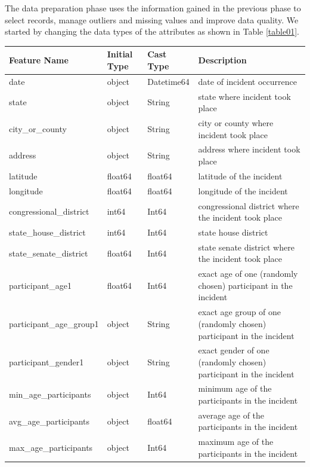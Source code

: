 \documentclass[10pt,a4paper]{report}
\begin{document}
The data preparation phase uses the information gained in the previous phase to select records, manage outliers and missing values and improve data quality.
We started by changing the data types of the attributes as shown in Table \ref{table01}.

\begin{table}
	\centering
	\begin{small}
	\begin{tabular}{|l|l|l|p{7cm}|}
		\hline
		\textbf{Feature Name} & \textbf{Initial Type} & \textbf{Cast Type} & \textbf{Description}\\
		\hline
		date & object & Datetime64 & date of incident occurrence\\
		\hline
		state & object & String & state where incident took place\\
		\hline
		city\_or\_county & object & String & city or county where incident took place\\
		\hline
		address & object & String & address where incident took place\\
		\hline
		latitude & float64 & float64 & latitude of the incident\\
		\hline
		longitude & float64 & float64 & longitude of the incident\\
		\hline
		congressional\_district & int64 & Int64 & congressional district where the incident took place\\
		\hline
		state\_house\_district & int64 & Int64 & state house district\\
		\hline
		state\_senate\_district & float64 & Int64 & state senate district where the incident took place\\
		\hline
		participant\_age1 & float64 & Int64 & exact age of one (randomly chosen) participant in the incident\\
		\hline
		participant\_age\_group1 & object & String & exact age group of one (randomly chosen) participant in the incident\\
		\hline
		participant\_gender1 & object & String & exact gender of one (randomly chosen) participant in the incident\\
		\hline
		min\_age\_participants & object & Int64 & minimum age of the participants in the incident\\
		\hline
		avg\_age\_participants & object & float64 & average age of the participants in the incident\\
		\hline
		max\_age\_participants & object & Int64 & maximum age of the participants in the incident\\

\end{tabular}
\end{small}
\end{table}
\end{document}
